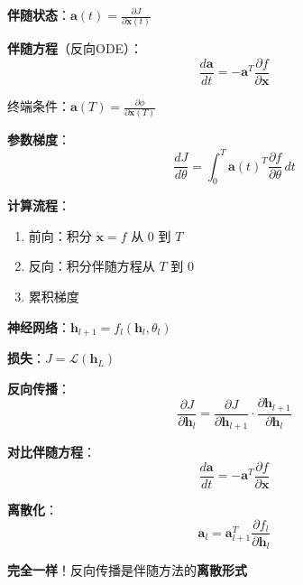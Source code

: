 \documentclass[12pt, a4paper]{ctexart}
\begin{document}
\begin{blackboard}[伴随方程]

\textbf{伴随状态}：$\mathbf{a}(t) = \frac{\partial J}{\partial \mathbf{x}(t)}$

\textbf{伴随方程}（反向ODE）：
\[
\boxed{\frac{d\mathbf{a}}{dt} = -\mathbf{a}^T \frac{\partial f}{\partial \mathbf{x}}}
\]

终端条件：$\mathbf{a}(T) = \frac{\partial \phi}{\partial \mathbf{x}(T)}$

\textbf{参数梯度}：
\[
\frac{dJ}{d\theta} = \int_0^T \mathbf{a}(t)^T \frac{\partial f}{\partial \theta} \, dt
\]

\textbf{计算流程}：
\begin{enumerate}
    \item 前向：积分 $\dot{\mathbf{x}} = f$ 从 $0$ 到 $T$
    \item 反向：积分伴随方程从 $T$ 到 $0$
    \item 累积梯度
\end{enumerate}

\end{blackboard}

\begin{blackboard}[伴随方法 = 反向传播]

\textbf{神经网络}：$\mathbf{h}_{l+1} = f_l(\mathbf{h}_l, \theta_l)$

\textbf{损失}：$J = \mathcal{L}(\mathbf{h}_L)$

\textbf{反向传播}：
\[
\frac{\partial J}{\partial \mathbf{h}_l} = \frac{\partial J}{\partial \mathbf{h}_{l+1}} \cdot \frac{\partial \mathbf{h}_{l+1}}{\partial \mathbf{h}_l}
\]

\textbf{对比伴随方程}：
\[
\frac{d\mathbf{a}}{dt} = -\mathbf{a}^T \frac{\partial f}{\partial \mathbf{x}}
\]

\textbf{离散化}：
\[
\mathbf{a}_l = \mathbf{a}_{l+1}^T \frac{\partial f_l}{\partial \mathbf{h}_l}
\]

\textbf{完全一样}！反向传播是伴随方法的\textbf{离散形式}

\end{blackboard}
\end{document}

